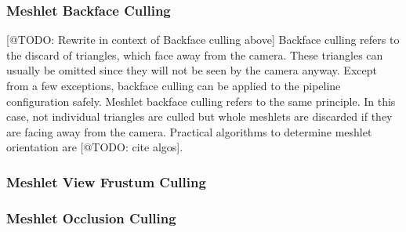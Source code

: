 \subsubsection{Meshlet Backface Culling} \label{subsubsec-meshlet-backface-culling}

[@TODO: Rewrite in context of Backface culling above]
Backface culling refers to the discard of triangles, which face away from the camera. These triangles can usually be omitted 
since they will not be seen by the camera anyway. Except from a few exceptions, backface culling can be applied to the 
pipeline configuration safely. Meshlet backface culling refers to the same principle. In this case, not individual triangles  
are culled but whole meshlets are discarded if they are facing away from the camera. Practical algorithms to determine meshlet 
orientation are [@TODO: cite algos].\\ %


\subsubsection{Meshlet View Frustum Culling} \label{subsubsec-meshlet-view-frustum-culling}

\subsubsection{Meshlet Occlusion Culling} \label{subsubsec-meshlet-occlusion-culling}